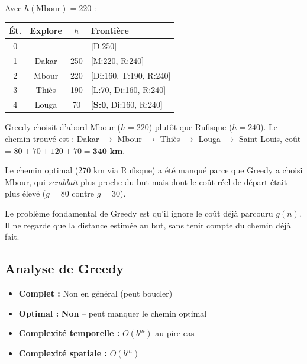 \documentclass[11pt,a4paper]{article}
\begin{document}
\begin{exemplebox}
Avec $h(\text{Mbour}) = 220$ :

{\small
\begin{center}
\begin{tabular}{|c|c|c|l|}
\hline
\textbf{Ét.} & \textbf{Explore} & $h$ & \textbf{Frontière} \\
\hline
0 & -- & -- & [D:250] \\
1 & Dakar & 250 & [M:220, R:240] \\
2 & Mbour & 220 & [Di:160, T:190, R:240] \\
3 & Thiès & 190 & [L:70, Di:160, R:240] \\
4 & Louga & 70 & [\textbf{S:0}, Di:160, R:240] \\
\hline
\end{tabular}
\end{center}
}

Greedy choisit d'abord Mbour ($h = 220$) plutôt que Rufisque ($h = 240$). Le chemin trouvé est : Dakar $\rightarrow$ Mbour $\rightarrow$ Thiès $\rightarrow$ Louga $\rightarrow$ Saint-Louis, coût = $80 + 70 + 120 + 70 = \textbf{340 km}$.

Le chemin optimal (270 km via Rufisque) a été manqué parce que Greedy a choisi Mbour, qui \textit{semblait} plus proche du but mais dont le coût réel de départ était plus élevé ($g = 80$ contre $g = 30$).
\end{exemplebox}

Le problème fondamental de Greedy est qu'il ignore le coût déjà parcouru $g(n)$. Il ne regarde que la distance estimée au but, sans tenir compte du chemin déjà fait.

\subsection{Analyse de Greedy}

\begin{theorembox}
\begin{itemize}
    \item \textbf{Complet :} Non en général (peut boucler)
    \item \textbf{Optimal :} \textbf{Non} -- peut manquer le chemin optimal
    \item \textbf{Complexité temporelle :} $O(b^m)$ au pire cas
    \item \textbf{Complexité spatiale :} $O(b^m)$
\end{itemize}
\end{theorembox}
\end{document}
